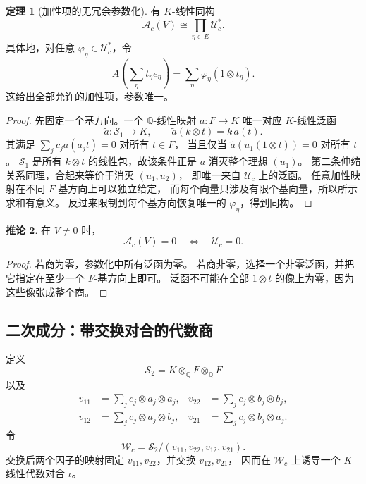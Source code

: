\documentclass[UTF8,11pt,a4paper]{ctexart}
\theoremstyle{definition}
\newtheorem{theorem}{定理}[section]
\newtheorem{corollary}[theorem]{推论}
\newcommand{\Q}{\mathbb Q}
\newcommand{\Uc}{\mathscr U_c}
\newcommand{\Wc}{\mathscr W_c}
\numberwithin{equation}{section}
\begin{document}
\begin{theorem}[加性项的无冗余参数化]\label{thm:addtensor}
有 $K$-线性同构
\begin{equation}\label{eq:addtensor}
 \mathcal A_c(V)\cong\prod_{\eta\in E}\Uc^*.
\end{equation}
具体地，对任意 $\varphi_\eta\in\Uc^*$，令
\[
 A\!\left(\sum_\eta t_\eta e_\eta\right)
 =\sum_\eta\varphi_\eta\!\left(\overline{1\otimes t_\eta}\right).
\]
这给出全部允许的加性项，参数唯一。
\end{theorem}
\begin{proof}
先固定一个基方向。一个 $\Q$-线性映射 $a:F\to K$ 唯一对应
$K$-线性泛函
\[
 \widetilde a:\mathscr S_1\to K,\qquad
 \widetilde a(k\otimes t)=k\,a(t).
\]
其满足 $\sum_jc_ja(a_jt)=0$ 对所有 $t\in F$，
当且仅当 $\widetilde a(u_1(1\otimes t))=0$ 对所有 $t$。
$\mathscr S_1$ 是所有 $k\otimes t$ 的线性包，故该条件正是
$\widetilde a$ 消灭整个理想 $(u_1)$。
第二条伸缩关系同理，合起来等价于消灭 $(u_1,u_2)$，
即唯一来自 $\Uc$ 上的泛函。
任意加性映射在不同 $F$-基方向上可以独立给定，
而每个向量只涉及有限个基向量，所以所示求和有意义。
反过来限制到每个基方向恢复唯一的 $\varphi_\eta$，得到同构。
\end{proof}

\begin{corollary}\label{cor:addnonzero}
在 $V\ne0$ 时，
\[
 \mathcal A_c(V)=0\quad\Longleftrightarrow\quad\Uc=0.
\]
\end{corollary}
\begin{proof}
若商为零，参数化中所有泛函为零。
若商非零，选择一个非零泛函，并把它指定在至少一个 $F$-基方向上即可。
泛函不可能在全部 $1\otimes t$ 的像上为零，因为这些像张成整个商。
\end{proof}

\subsection{二次成分：带交换对合的代数商}
定义
\[
 \mathscr S_2=K\otimes_{\Q}F\otimes_{\Q}F
\]
以及
\[
 \begin{aligned}
 v_{11}&=\sum_jc_j\otimes a_j\otimes a_j,&
 v_{22}&=\sum_jc_j\otimes b_j\otimes b_j,\\
 v_{12}&=\sum_jc_j\otimes a_j\otimes b_j,&
 v_{21}&=\sum_jc_j\otimes b_j\otimes a_j.
 \end{aligned}
\]
令
\[
 \Wc=\mathscr S_2/(v_{11},v_{22},v_{12},v_{21}).
\]
交换后两个因子的映射固定 $v_{11},v_{22}$，并交换 $v_{12},v_{21}$，
因而在 $\Wc$ 上诱导一个 $K$-线性代数对合 $\iota$。
\end{document}
